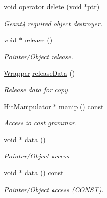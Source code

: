 \begin{DoxyCompactItemize}
void \hyperlink{class_d_d4hep_1_1_simulation_1_1_geant4_hit_wrapper_a3ca9f5bf49528ab59adaa68d2708f8c3}{operator delete} (void $\ast$ptr)
\begin{DoxyCompactList}\small\item\em Geant4 required object destroyer. \item\end{DoxyCompactList}\item 
void $\ast$ \hyperlink{class_d_d4hep_1_1_simulation_1_1_geant4_hit_wrapper_a1af3edf59bb6c955fe91582394854acd}{release} ()
\begin{DoxyCompactList}\small\item\em Pointer/Object release. \item\end{DoxyCompactList}\item 
\hyperlink{class_d_d4hep_1_1_simulation_1_1_geant4_hit_wrapper_a4779e35eba7d553e0f2d497c49a42ec6}{Wrapper} \hyperlink{class_d_d4hep_1_1_simulation_1_1_geant4_hit_wrapper_acec7d2a18d078071d5714dd4a0c45739}{releaseData} ()
\begin{DoxyCompactList}\small\item\em Release data for copy. \item\end{DoxyCompactList}\item 
\hyperlink{class_d_d4hep_1_1_simulation_1_1_geant4_hit_wrapper_1_1_hit_manipulator}{HitManipulator} $\ast$ \hyperlink{class_d_d4hep_1_1_simulation_1_1_geant4_hit_wrapper_a7d21c352f12b3a7c0dedc895a270caf1}{manip} () const 
\begin{DoxyCompactList}\small\item\em Access to cast grammar. \item\end{DoxyCompactList}\item 
void $\ast$ \hyperlink{class_d_d4hep_1_1_simulation_1_1_geant4_hit_wrapper_af7b7738a7307f1f9372dc37efc319dc6}{data} ()
\begin{DoxyCompactList}\small\item\em Pointer/Object access. \item\end{DoxyCompactList}\item 
void $\ast$ \hyperlink{class_d_d4hep_1_1_simulation_1_1_geant4_hit_wrapper_a07f376a52c5648d4b0efd63d113c5c03}{data} () const 
\begin{DoxyCompactList}\small\item\em Pointer/Object access (CONST). \item\end{DoxyCompactList}\item 

\end{DoxyCompactItemize}
